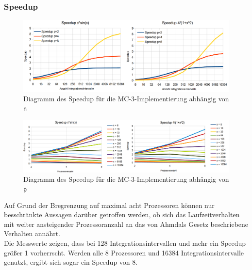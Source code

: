 \documentclass[a4paper,12pt]{scrartcl}
\begin{document}
\subsubsection{Speedup}
\begin{figure}[htb]
  \begin{center}
    \includegraphics[width=1\hsize]{../mc3_speedup.png}
  \end{center}
  \caption{\label{mc3speedup}
    Diagramm des Speedup f\"ur die MC-3-Implementierung abh\"angig von \texttt{n}}
\end{figure}
\begin{figure}[htb]
  \begin{center}
    \includegraphics[width=1\hsize]{../mc3_speeduppercpu.png}
  \end{center}
  \caption{\label{mc3speeduppercpu}
    Diagramm des Speedup f\"ur die MC-3-Implementierung abh\"angig von \texttt{p}}
\end{figure}
Auf Grund der Bregrenzung auf maximal acht Prozessoren k\"onnen nur besschr\"ankte Aussagen dar\"uber getroffen werden, ob sich das Laufzeitverhalten
mit weiter ansteigender Prozessoranzahl an das von Ahmdals Gesetz beschriebene Verhalten ann\"ahrt.\\

Die Messwerte zeigen, dass bei 128 Integrationsintervallen und mehr ein Speedup gr\"o\ss{}er 1 vorherrscht. Werden alle 8 Prozessoren und 16384
Integrationsintervalle genutzt, ergibt sich sogar ein Speedup von 8.\\

\clearpage
\end{document}
